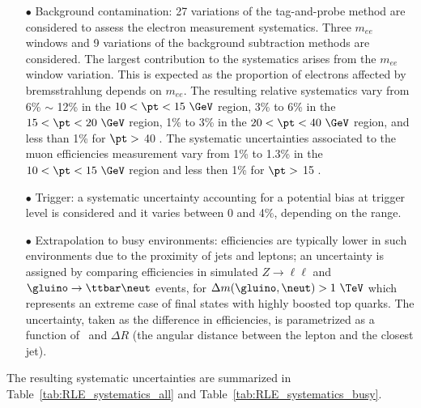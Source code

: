 \begin{itemize}
\item[$\bullet$] Background contamination: 27 variations of the tag-and-probe method are considered to assess the electron measurement systematics.
Three $m_{ee}$ windows and 9 variations of the background subtraction methods are considered.
The largest contribution to the systematics arises from the $m_{ee}$ window variation.
This is expected as the proportion of electrons affected by bremsstrahlung depends on $m_{ee}$.
The resulting relative systematics vary from 6\% $\sim$ 12\% in the $10<\pt<15~\GeV$ region, 3\% to 6\% in the $15<\pt<20~\GeV$ region, 1\% to 3\% in the $20<\pt<40~\GeV$ region, and less than 1\% for $\pt >$ 40 \GeV.
The systematic uncertainties associated to the muon efficiencies measurement vary from 1\% to 1.3\% in the $10<\pt<15~\GeV$ region and less then 1\% for $\pt >$ 15 \GeV. 
\item[$\bullet$] Trigger: a systematic uncertainty accounting for a potential bias at trigger level is considered and it varies between 0 and 4\%, depending on the \pt range.
\item[$\bullet$] Extrapolation to busy environments: efficiencies are typically lower in such environments due to the proximity of jets and leptons; 
an uncertainty is assigned by comparing efficiencies in simulated $Z\to\ell\ell$ and $\gluino\to\ttbar\neut$ events, for $\Delta m(\gluino,\neut)>1~\TeV$ which represents an extreme case of final states with highly boosted top quarks. 
The uncertainty, taken as the difference in efficiencies, is parametrized as a function of \pt\ and $\Delta R$ (the angular distance between the lepton and the closest jet). 
\end{itemize}
The resulting systematic uncertainties are summarized in Table~\ref{tab:RLE_systematics_all} and Table~\ref{tab:RLE_systematics_busy}.


